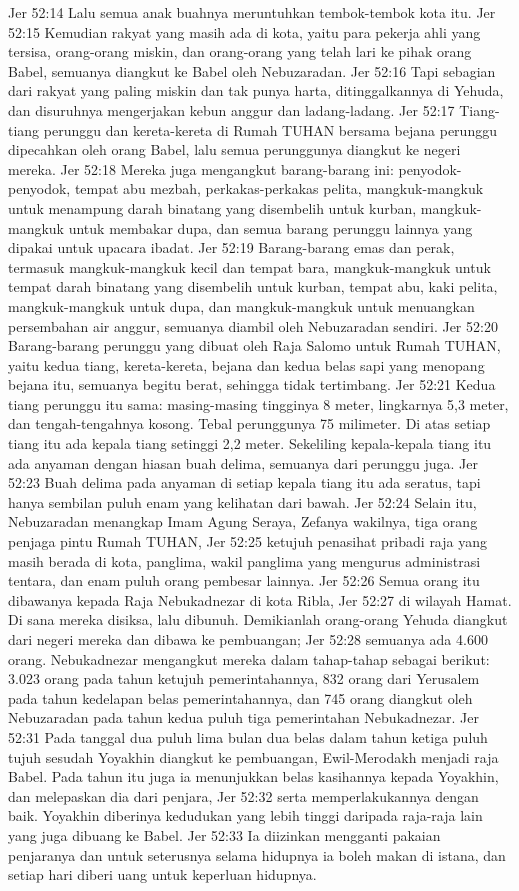 Jer 52:14  Lalu semua anak buahnya meruntuhkan tembok-tembok kota itu.
Jer 52:15  Kemudian rakyat yang masih ada di kota, yaitu para pekerja ahli yang tersisa, orang-orang miskin, dan orang-orang yang telah lari ke pihak orang Babel, semuanya diangkut ke Babel oleh Nebuzaradan.
Jer 52:16  Tapi sebagian dari rakyat yang paling miskin dan tak punya harta, ditinggalkannya di Yehuda, dan disuruhnya mengerjakan kebun anggur dan ladang-ladang.
Jer 52:17  Tiang-tiang perunggu dan kereta-kereta di Rumah TUHAN bersama bejana perunggu dipecahkan oleh orang Babel, lalu semua perunggunya diangkut ke negeri mereka.
Jer 52:18  Mereka juga mengangkut barang-barang ini: penyodok-penyodok, tempat abu mezbah, perkakas-perkakas pelita, mangkuk-mangkuk untuk menampung darah binatang yang disembelih untuk kurban, mangkuk-mangkuk untuk membakar dupa, dan semua barang perunggu lainnya yang dipakai untuk upacara ibadat.
Jer 52:19  Barang-barang emas dan perak, termasuk mangkuk-mangkuk kecil dan tempat bara, mangkuk-mangkuk untuk tempat darah binatang yang disembelih untuk kurban, tempat abu, kaki pelita, mangkuk-mangkuk untuk dupa, dan mangkuk-mangkuk untuk menuangkan persembahan air anggur, semuanya diambil oleh Nebuzaradan sendiri.
Jer 52:20  Barang-barang perunggu yang dibuat oleh Raja Salomo untuk Rumah TUHAN, yaitu kedua tiang, kereta-kereta, bejana dan kedua belas sapi yang menopang bejana itu, semuanya begitu berat, sehingga tidak tertimbang.
Jer 52:21  Kedua tiang perunggu itu sama: masing-masing tingginya 8 meter, lingkarnya 5,3 meter, dan tengah-tengahnya kosong. Tebal perunggunya 75 milimeter. Di atas setiap tiang itu ada kepala tiang setinggi 2,2 meter. Sekeliling kepala-kepala tiang itu ada anyaman dengan hiasan buah delima, semuanya dari perunggu juga.
Jer 52:23  Buah delima pada anyaman di setiap kepala tiang itu ada seratus, tapi hanya sembilan puluh enam yang kelihatan dari bawah.
Jer 52:24  Selain itu, Nebuzaradan menangkap Imam Agung Seraya, Zefanya wakilnya, tiga orang penjaga pintu Rumah TUHAN,
Jer 52:25  ketujuh penasihat pribadi raja yang masih berada di kota, panglima, wakil panglima yang mengurus administrasi tentara, dan enam puluh orang pembesar lainnya.
Jer 52:26  Semua orang itu dibawanya kepada Raja Nebukadnezar di kota Ribla,
Jer 52:27  di wilayah Hamat. Di sana mereka disiksa, lalu dibunuh. Demikianlah orang-orang Yehuda diangkut dari negeri mereka dan dibawa ke pembuangan;
Jer 52:28  semuanya ada 4.600 orang. Nebukadnezar mengangkut mereka dalam tahap-tahap sebagai berikut: 3.023 orang pada tahun ketujuh pemerintahannya, 832 orang dari Yerusalem pada tahun kedelapan belas pemerintahannya, dan 745 orang diangkut oleh Nebuzaradan pada tahun kedua puluh tiga pemerintahan Nebukadnezar.
Jer 52:31  Pada tanggal dua puluh lima bulan dua belas dalam tahun ketiga puluh tujuh sesudah Yoyakhin diangkut ke pembuangan, Ewil-Merodakh menjadi raja Babel. Pada tahun itu juga ia menunjukkan belas kasihannya kepada Yoyakhin, dan melepaskan dia dari penjara,
Jer 52:32  serta memperlakukannya dengan baik. Yoyakhin diberinya kedudukan yang lebih tinggi daripada raja-raja lain yang juga dibuang ke Babel.
Jer 52:33  Ia diizinkan mengganti pakaian penjaranya dan untuk seterusnya selama hidupnya ia boleh makan di istana, dan setiap hari diberi uang untuk keperluan hidupnya.


